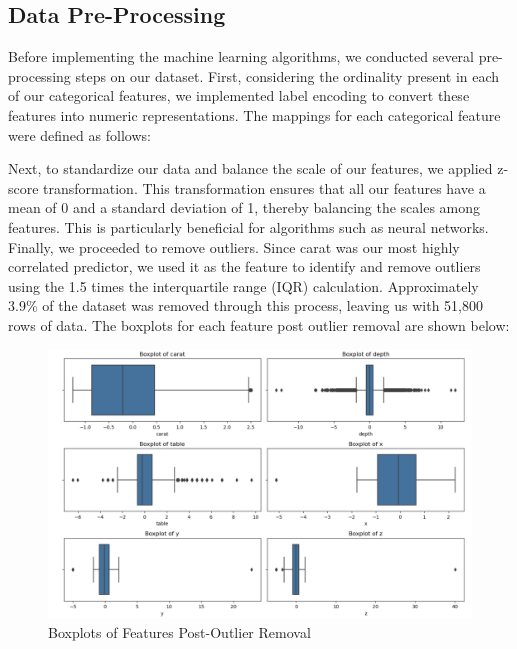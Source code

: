 \documentclass[conference]{IEEEtran}
\begin{document}
\subsection{Data Pre-Processing} 

Before implementing the machine learning algorithms, we conducted several pre-processing steps on our dataset. First, considering the ordinality present in each of our categorical features, we implemented label encoding to convert these features into numeric representations. The mappings for each categorical feature were defined as follows:

\begin{table}[htbp]
    \centering
    \caption{Label Encodings for Categorical Features}
    \label{tab:label_encodings}
\end{table}

Next, to standardize our data and balance the scale of our features, we applied z-score transformation. This transformation ensures that all our features have a mean of 0 and a standard deviation of 1, thereby balancing the scales among features. This is particularly beneficial for algorithms such as neural networks. Finally, we proceeded to remove outliers. Since carat was our most highly correlated predictor, we used it as the feature to identify and remove outliers using the 1.5 times the interquartile range (IQR) calculation. Approximately 3.9\% of the dataset was removed through this process, leaving us with 51,800 rows of data. The boxplots for each feature post outlier removal are shown below:

\begin{figure}[H]
    \centering
    \includegraphics[width=0.8\linewidth]{boxplot.png} %
    \caption{Boxplots of Features Post-Outlier Removal}
    \label{fig:boxplots}
\end{figure}
\end{document}
